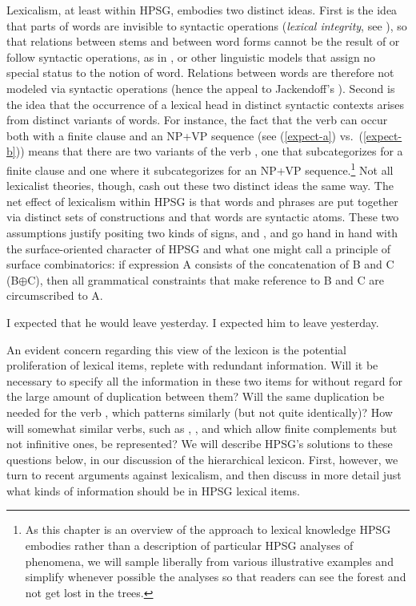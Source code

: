 \documentclass[output=paper
                ,modfonts
                ,nonflat
	        ,collection
	        ,collectionchapter
	        ,collectiontoclongg
 	        ,biblatex
                ,babelshorthands
                ,newtxmath
                ,draftmode
                ,colorlinks, citecolor=brown
]{./langsci/langscibook}
\begin{document}
{Lexicalism, at least within HPSG, embodies two distinct ideas. First is the idea that parts of words are invisible to syntactic operations (\emph{lexical integrity}, see \citealt{BresnanandMchombo1995}), so that relations between stems and between word forms cannot be the result of or follow syntactic operations, as in  \citep{HalleandMarantz1993}, or other linguistic models that assign no special status to the notion of word. Relations between words are therefore not modeled via syntactic operations (hence the appeal to Jackendoff's ). Second is the idea that the occurrence of a lexical head in distinct syntactic contexts arises from distinct variants of words. For instance, the fact that the verb  can occur both with a finite clause and an NP+VP sequence (see (\ref{expect-a}) vs.\ (\ref{expect-b})) means that there are two variants of the verb , one that subcategorizes for a finite clause and one where it subcategorizes for an NP+VP sequence.\footnote{As this chapter is an overview of the approach to lexical knowledge HPSG embodies rather than a description of particular HPSG analyses of phenomena, we will sample liberally from various illustrative examples and simplify whenever possible the analyses so that readers can see the forest and not get lost in the trees.} Not all lexicalist theories, though, cash out these two distinct ideas the same way. The net effect of lexicalism within HPSG is that words and phrases are put together via distinct sets of constructions and that words are syntactic atoms. These two assumptions justify positing two kinds of signs,  and , and go hand in hand with the surface-oriented character of HPSG and what one might call a principle of surface combinatorics: if expression A consists of the concatenation of B and C (B$\oplus$C), then all grammatical constraints that make reference to B and C are circumscribed to A. 

\begin{exe}
	\ex \label{expect-b} I expected that he would leave yesterday.
	\ex \label{expect-a} I expected him to leave yesterday.
\end{exe}

An evident concern regarding this view of the lexicon is the potential proliferation of lexical items, replete with redundant information. Will it be necessary to specify all the information in these two items for  without regard for the large amount of duplication between them? Will the same duplication be needed for the verb  , which patterns similarly (but not quite identically)? How will somewhat similar verbs, such as , , and  which allow finite complements but not infinitive ones, be represented? We will describe HPSG's solutions to these questions below, in our discussion of the hierarchical lexicon. First, however, we turn to recent arguments against lexicalism, and then discuss in more detail just what kinds of information should be in HPSG lexical items.

}
\end{document}
